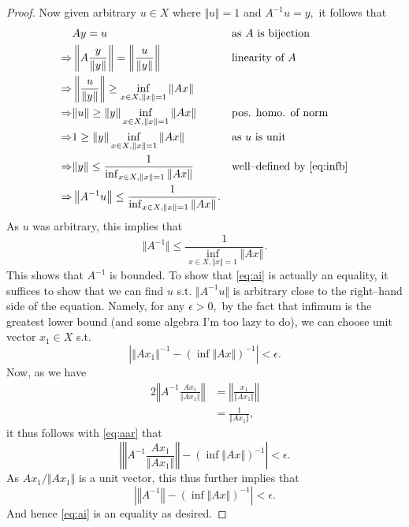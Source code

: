 \documentclass[10pt]{article}
\begin{document}
\begin{proof}
    Now given arbitrary $u\in X$ where $\Vert u\Vert = 1$ and $A^{-1}u = y,$ it follows that
    \begin{alignat*}{2}
        &Ay = u &&\text{as $A$ is bijection}\\
        \Rightarrow& \left\Vert A \frac{y}{\Vert y\Vert}\right\Vert = \left\Vert \frac{u}{\Vert y\Vert}\right\Vert &&\text{linearity of $A$}\\
        \Rightarrow& \left\Vert \frac{u}{\Vert y\Vert}\right\Vert \ge \inf_{x\in X,\Vert x\Vert=1}\Vert Ax\Vert\\
        \Rightarrow& \Vert u\Vert \ge \Vert y\Vert\inf_{x\in X,\Vert x\Vert=1}\Vert Ax\Vert &&\text{pos. homo. of norm}\\
        \Rightarrow& 1 \ge \Vert y\Vert\inf_{x\in X,\Vert x\Vert=1}\Vert Ax\Vert &&\text{as $u$ is unit}\\
        \Rightarrow& \Vert y\Vert \le \frac{1}{\inf_{x\in X,\Vert x\Vert=1}\Vert Ax\Vert} \qquad&&\text{well--defined by \eqref{eq:infb}}\\
        \Rightarrow& \left\Vert A^{-1}u\right\Vert \le \frac{1}{\inf_{x\in X,\Vert x\Vert=1}\Vert Ax\Vert}.
    \end{alignat*}
    As $u$ was arbitrary, this implies that
    \begin{equation} \label{eq:ai}
        \Vert A^{-1} \Vert \le \frac{1}{\inf_{x\in X,\Vert x\Vert=1}\Vert Ax\Vert}.
    \end{equation}
    This shows that $A^{-1}$ is bounded. To show that \eqref{eq:ai} is actually an equality, it suffices to show that we can find $u$ s.t. $\Vert A^{-1}u \Vert$ is arbitrary close to the right--hand side of the equation.
    Namely, for any $\epsilon>0,$ by the fact that infimum is the greatest lower bound (and some algebra I'm too lazy to do), we can choose unit vector $x_1 \in X$ s.t.
    \begin{equation}\label{eq:aar}
        \left|\left\Vert Ax_1\right\Vert^{-1} - \left(\inf \Vert Ax\Vert\right)^{-1}\right| < \epsilon.
    \end{equation}
    Now, as we have
    \begin{alignat*}{2}
        \left \Vert A^{-1}\frac{Ax_1}{\Vert Ax_1\Vert} \right \Vert &= \left \Vert \frac{x_1}{\Vert Ax_1\Vert}\right\Vert\\
        &= \frac{1}{\Vert Ax_1\Vert},
    \end{alignat*}
    it thus follows with \eqref{eq:aar} that
    \[\left|\left \Vert A^{-1}\frac{Ax_1}{\Vert Ax_1\Vert} \right \Vert - \left(\inf \Vert Ax\Vert\right)^{-1}\right| < \epsilon.\]
    As $Ax_1/\Vert Ax_1\Vert$ is a unit vector, this thus further implies that
    \[\left|\left \Vert A^{-1} \right \Vert - \left(\inf \Vert Ax\Vert\right)^{-1}\right| < \epsilon.\]
    And hence \eqref{eq:ai} is an equality as desired.
\end{proof}
\end{document}
